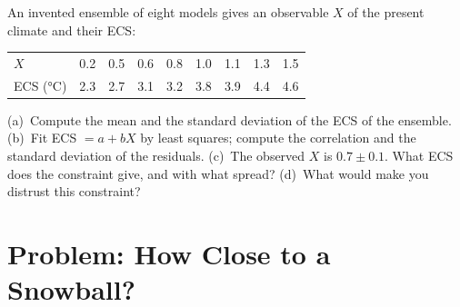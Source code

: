 \begin{exercise}[$\star\star\star$]\label{exo:b3:climate-models:12}
An invented ensemble of eight models gives an observable $X$ of the
present climate and their ECS:
\begin{center}
\begin{tabular}{l*{8}{c}}
\hline
$X$ & 0.2 & 0.5 & 0.6 & 0.8 & 1.0 & 1.1 & 1.3 & 1.5\\
ECS (\unit{\celsius}) & 2.3 & 2.7 & 3.1 & 3.2 & 3.8 & 3.9 & 4.4 & 4.6\\
\hline
\end{tabular}
\end{center}
(a)~Compute the mean and the standard deviation of the ECS of the
ensemble. (b)~Fit ECS $= a + bX$ by least squares; compute the correlation
and the standard deviation of the residuals. (c)~The observed $X$ is $0.7
\pm 0.1$. What ECS does the constraint give, and with what spread?
(d)~What would make you distrust this constraint?
\end{exercise}

\section{Problem: How Close to a Snowball?}

